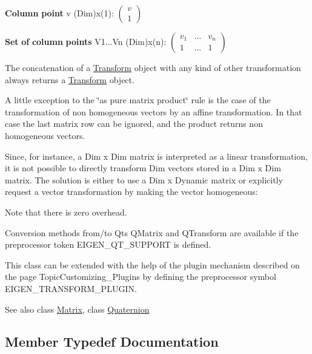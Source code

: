 {\bfseries{Column}} {\bfseries{point}} v (Dim)x(1)\+: $ \left( \begin{array}{c} v\\ 1 \end{array} \right) $

{\bfseries{Set}} {\bfseries{of}} {\bfseries{column}} {\bfseries{points}} V1...Vn (Dim)x(n)\+: $ \left( \begin{array}{ccc} v_1 & ... & v_n\\ 1 & ... & 1 \end{array} \right) $

The concatenation of a \mbox{\hyperlink{class_eigen_1_1_transform}{Transform}} object with any kind of other transformation always returns a \mbox{\hyperlink{class_eigen_1_1_transform}{Transform}} object.

A little exception to the \char`\"{}as pure matrix product\char`\"{} rule is the case of the transformation of non homogeneous vectors by an affine transformation. In that case the last matrix row can be ignored, and the product returns non homogeneous vectors.

Since, for instance, a Dim x Dim matrix is interpreted as a linear transformation, it is not possible to directly transform Dim vectors stored in a Dim x Dim matrix. The solution is either to use a Dim x Dynamic matrix or explicitly request a vector transformation by making the vector homogeneous\+: 
\begin{DoxyCode}{0}
\end{DoxyCode}
 Note that there is zero overhead.

Conversion methods from/to Qt\textquotesingle{}s Q\+Matrix and Q\+Transform are available if the preprocessor token E\+I\+G\+E\+N\+\_\+\+Q\+T\+\_\+\+S\+U\+P\+P\+O\+RT is defined.

This class can be extended with the help of the plugin mechanism described on the page Topic\+Customizing\+\_\+\+Plugins by defining the preprocessor symbol {\ttfamily E\+I\+G\+E\+N\+\_\+\+T\+R\+A\+N\+S\+F\+O\+R\+M\+\_\+\+P\+L\+U\+G\+IN}.

\begin{DoxySeeAlso}{See also}
class \mbox{\hyperlink{class_eigen_1_1_matrix}{Matrix}}, class \mbox{\hyperlink{class_eigen_1_1_quaternion}{Quaternion}} 
\end{DoxySeeAlso}


\subsection{Member Typedef Documentation}
\mbox{\label{class_eigen_1_1_transform_a8319bad977b0dabf2dfaf2e2dc30f13e}} 
